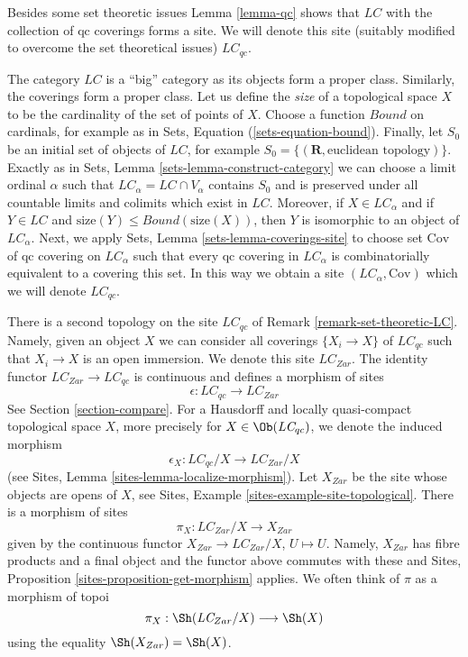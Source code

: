 \noindent
Besides some set theoretic issues Lemma \ref{lemma-qc} shows that
$\textit{LC}$ with the collection of qc coverings forms a site.
We will denote this site (suitably modified to overcome the
set theoretical issues)
$\textit{LC}_{qc}$.

\begin{remark}
\label{remark-set-theoretic-LC}
The category $\textit{LC}$ is a ``big'' category as its objects form
a proper class. Similarly, the coverings form a proper class.
Let us define the {\it size} of a topological space $X$ to be the
cardinality of the set of points of $X$. Choose a function
$Bound$ on cardinals, for example as in
Sets, Equation (\ref{sets-equation-bound}).
Finally, let $S_0$ be an initial set of objects of $\textit{LC}$,
for example $S_0 = \{(\mathbf{R}, \text{euclidean topology})\}$.
Exactly as in Sets, Lemma \ref{sets-lemma-construct-category}
we can choose a limit ordinal $\alpha$ such that
$\textit{LC}_\alpha = \textit{LC} \cap V_\alpha$
contains $S_0$ and is preserved under all countable limits and
colimits which exist in $\textit{LC}$. Moreover, if $X \in \textit{LC}_\alpha$
and if $Y \in \textit{LC}$ and
$\text{size}(Y) \leq Bound(\text{size}(X))$, then $Y$ is isomorphic
to an object of $\textit{LC}_\alpha$.
Next, we apply Sets, Lemma \ref{sets-lemma-coverings-site}
to choose set $\text{Cov}$ of qc covering on $\textit{LC}_\alpha$
such that every qc covering in $\textit{LC}_\alpha$ is
combinatorially equivalent to a covering this set.
In this way we obtain a site $(\textit{LC}_\alpha, \text{Cov})$
which we will denote $\textit{LC}_{qc}$.
\end{remark}

\noindent
There is a second topology on the site $\textit{LC}_{qc}$ of
Remark \ref{remark-set-theoretic-LC}. Namely, given an object
$X$ we can consider all coverings $\{X_i \to X\}$ of $\textit{LC}_{qc}$
such that $X_i \to X$ is an open immersion. We denote this site
$\textit{LC}_{Zar}$. The identity functor
$\textit{LC}_{Zar} \to \textit{LC}_{qc}$ is continuous and defines
a morphism of sites
$$
\epsilon : \textit{LC}_{qc} \longrightarrow \textit{LC}_{Zar}
$$
See Section \ref{section-compare}.
For a Hausdorff and locally quasi-compact topological space $X$, more
precisely for $X \in \Ob(\textit{LC}_{qc})$, we denote the induced morphism
$$
\epsilon_X : \textit{LC}_{qc}/X \longrightarrow \textit{LC}_{Zar}/X
$$
(see Sites, Lemma \ref{sites-lemma-localize-morphism}).
Let $X_{Zar}$ be the site whose objects are opens of $X$, see
Sites, Example \ref{sites-example-site-topological}.
There is a morphism of sites
$$
\pi_X : \textit{LC}_{Zar}/X \longrightarrow X_{Zar}
$$
given by the continuous functor
$X_{Zar} \to \textit{LC}_{Zar}/X$, $U \mapsto U$.
Namely, $X_{Zar}$ has fibre products and a final object and the
functor above commutes with these and
Sites, Proposition \ref{sites-proposition-get-morphism} applies.
We often think of $\pi$ as a morphism of topoi
$$
\pi_X : \Sh(\textit{LC}_{Zar}/X) \longrightarrow \Sh(X)
$$
using the equality $\Sh(X_{Zar}) = \Sh(X)$.

